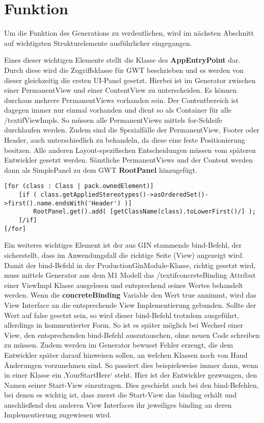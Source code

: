\section{Funktion}
Um die Funktion des Generations zu verdeutlichen, wird im nächsten Abschnitt auf wichtigsten Strukturelemente ausführlicher eingegangen.

Eines dieser wichtigen Elemente stellt die Klasse des \textbf{AppEntryPoint} dar. Durch diese wird die Zugriffsklasse für GWT beschrieben und es werden von dieser gleichzeitig die ersten UI-Panel gesetzt. Hierbei ist im Generator zwischen einer PermanentView und einer ContentView zu unterscheiden. Es können durchaus mehrere PermanentViews vorhanden sein. Der Contentbereich ist dagegen immer nur einmal vorhanden und dient so als Container für alle /textif{ViewImpls}. So müssen alle PermanentViews mittels for-Schleife durchlaufen werden. Zudem sind die Spezialfälle der PermanentView, Footer oder Header, auch unterschiedlich zu behandeln, da diese eine feste Positionierung besitzen. Alle anderen Layout-spezifischen Entscheidungen müssen vom späteren Entwickler gesetzt werden. Sämtliche PermanentViews und der Content werden dann als SimplePanel zu dem GWT \textbf{RootPanel} hinzugefügt. \\
\lstset{language=OCL}
\begin{lstlisting}[caption={Hinzufügen eines Panels zum RootPanel, am Beipsiel eines Header}]
[for (class : Class | pack.ownedElement)]
	[if ( class.getAppliedStereotypes()->asOrderedSet()->first().name.endsWith('Header') )]
		RootPanel.get().add( [getClassName(class).toLowerFirst()/] );
	[/if]
[/for]
\end{lstlisting}
Ein weiteres wichtiges Element ist der aus GIN stammende bind-Befehl, der sicherstellt, dass im Anwendungsfall die richtige Seite (View) angezeigt wird.
Damit der bind-Befehl in der ProductionGinModule-Klasse, richtig gesetzt wird, muss mittels Generator aus dem M1 Modell das /textif{concreteBinding} Attribut einer ViewImpl Klasse ausgelesen und entsprechend seines Wertes behandelt werden. Wenn die \textbf{concreteBinding} Variable den Wert true annimmt, wird das View Interface an die entsprechende View Implementierung gebunden. Sollte der Wert auf false gesetzt sein, so wird dieser bind-Befehl trotzdem ausgeführt, allerdings in kommentierter Form. So ist es später möglich bei Wechsel einer View, den entsprechenden bind-Befehl auszutauschen, ohne neuen Code schreiben zu müssen.
Zudem werden im Generator bewusst Fehler erzeugt, die dem Entwickler später darauf hinweisen sollen, an welchen Klassen noch von Hand Änderungen vorzunehmen sind. So passiert dies beispielsweise immer dann, wenn in einer Klasse ein ‚YourStartHere‘ steht. Hier ist der Entwickler gezwungen, den Namen seiner Start-View einzutragen. Dies geschieht auch bei den bind-Befehlen, bei denen es wichtig ist, dass zuerst die Start-View das binding erhält und anschließend den anderen View Interfaces ihr jeweiliges binding an deren Implementierung zugewiesen wird.
